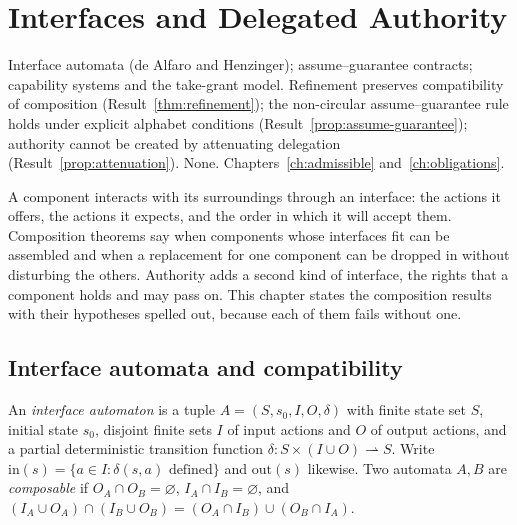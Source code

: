 \chapter{Interfaces and Delegated Authority}\label{ch:interfaces}
{Interface automata (de Alfaro and Henzinger); assume--guarantee contracts; capability systems and the take-grant model.}
{Refinement preserves compatibility of composition (Result~\ref{thm:refinement}); the non-circular assume--guarantee rule holds under explicit alphabet conditions (Result~\ref{prop:assume-guarantee}); authority cannot be created by attenuating delegation (Result~\ref{prop:attenuation}).}
{None.}
{Chapters~\ref{ch:admissible} and~\ref{ch:obligations}.}

A component interacts with its surroundings through an interface: the actions it offers, the actions it expects, and the order in which it will accept them. Composition theorems say when components whose interfaces fit can be assembled and when a replacement for one component can be dropped in without disturbing the others. Authority adds a second kind of interface, the rights that a component holds and may pass on. This chapter states the composition results with their hypotheses spelled out, because each of them fails without one.

\section{Interface automata and compatibility}

\begin{definition}\label{def:interface}
An \emph{interface automaton} is a tuple $A=(S,s_0,I,O,\delta)$ with finite state set $S$, initial state $s_0$, disjoint finite sets $I$ of input actions and $O$ of output actions, and a partial deterministic transition function $\delta:S\times(I\cup O)\rightharpoonup S$. Write $\mathrm{in}(s)=\{a\in I:\delta(s,a)\text{ defined}\}$ and $\mathrm{out}(s)$ likewise. Two automata $A,B$ are \emph{composable} if $O_A\cap O_B=\varnothing$, $I_A\cap I_B=\varnothing$, and $(I_A\cup O_A)\cap(I_B\cup O_B)=(O_A\cap I_B)\cup(O_B\cap I_A)$.
\end{definition}

